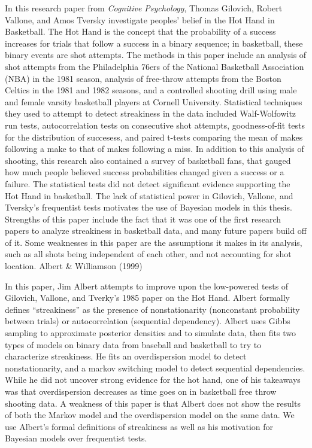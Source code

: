 \documentclass[12pt,twoside]{dukestatscithesis}
\theoremstyle{definition}
\theoremstyle{definition}
\theoremstyle{definition}
\theoremstyle{remark}
\begin{document}
In this research paper from \emph{Cognitive Psychology}, Thomas
Gilovich, Robert Vallone, and Amos Tversky investigate peoples' belief
in the Hot Hand in Basketball. The Hot Hand is the concept that the
probability of a success increases for trials that follow a success in a
binary sequence; in basketball, these binary events are shot attempts.
The methods in this paper include an analysis of shot attempts from the
Philadelphia 76ers of the National Basketball Association (NBA) in the
1981 season, analysis of free-throw attempts from the Boston Celtics in
the 1981 and 1982 seasons, and a controlled shooting drill using male
and female varsity basketball players at Cornell University. Statistical
techniques they used to attempt to detect streakiness in the data
included Walf-Wolfowitz run tests, autocorrelation tests on consecutive
shot attempts, goodness-of-fit tests for the distribution of succesess,
and paired t-tests comparing the mean of makes following a make to that
of makes following a miss. In addition to this analysis of shooting,
this research also contained a survey of basketball fans, that gauged
how much people believed success probabilities changed given a success
or a failure. The statistical tests did not detect significant evidence
supporting the Hot Hand in basketball. The lack of statistical power in
Gilovich, Vallone, and Tversky's frequentist tests motivates the use of
Bayesian models in this thesis. Strengths of this paper include the fact
that it was one of the first research papers to analyze streakiness in
basketball data, and many future papers build off of it. Some weaknesses
in this paper are the assumptions it makes in its analysis, such as all
shots being independent of each other, and not accounting for shot
location. Albert \& Williamson (1999)

In this paper, Jim Albert attempts to improve upon the low-powered tests
of Gilovich, Vallone, and Tverky's 1985 paper on the Hot Hand. Albert
formally defines ``streakiness'' as the presence of nonstationarity
(nonconstant probability between trials) or autocorrelation (sequential
dependency). Albert uses Gibbs sampling to approximate posterior
densities and to simulate data, then fits two types of models on binary
data from baseball and basketball to try to characterize streakiness. He
fits an overdispersion model to detect nonstationarity, and a markov
switching model to detect sequential dependencies. While he did not
uncover strong evidence for the hot hand, one of his takeaways was that
overdispersion decreases as time goes on in basketball free throw
shooting data. A weakness of this paper is that Albert does not show the
results of both the Markov model and the overdispersion model on the
same data. We use Albert's formal definitions of streakiness as well as
his motivation for Bayesian models over frequentist tests.
\end{document}
